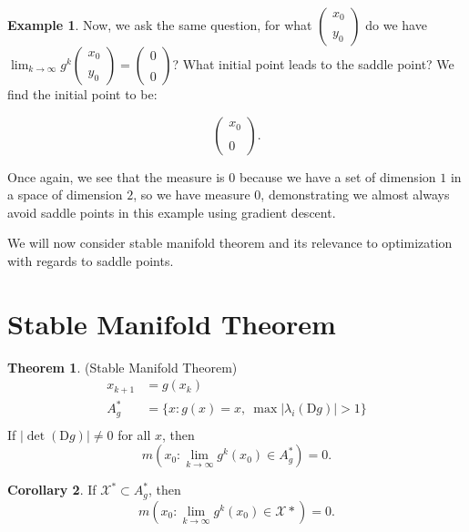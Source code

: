 \documentclass[twoside]{article}
\theoremstyle{definition}
\newtheorem{thm}{Theorem}[section]
\newtheorem{cor}[thm]{Corollary}
\theoremstyle{definition}
\newtheorem{exmp}{Example}
\theoremstyle{remark}
\begin{document}
\begin{exmp}
Now, we ask the same question, for what $\left(\begin{smallmatrix} x_{0} \\ \ \\ y_{0} \end{smallmatrix}\right)$ do we have $\lim_{k\to\infty} g^k\left(\begin{smallmatrix} x_{0} \\ \ \\ y_{0} \end{smallmatrix}\right) = \left(\begin{smallmatrix} 0 \\ \ \\ 0 \end{smallmatrix}\right)$? What initial point leads to the saddle point? We find the initial point to be:

$$\left(\begin{smallmatrix} x_0 \\ \ \\ 0 \end{smallmatrix}\right).$$
\end{exmp}

Once again, we see that the measure is 0 because we have a set of dimension $1$ in a space of dimension $2$, so we have measure 0, demonstrating we almost always avoid saddle points in this example using gradient descent.

We will now consider stable manifold theorem and its relevance to optimization with regards to saddle points.

\section{Stable Manifold Theorem}

\begin{thm}{(Stable Manifold Theorem)}
\[
\begin{aligned}
x_{k+1} &= g(x_k) \\
A_g^* &=  \{ x : g(x)=x, \ \max|\lambda_i (\text{D}g)| > 1 \} \\
\end{aligned}
\]
If $|\det(\text{D}g)| \neq 0$ for all $x$, then
$$m(x_0 : \lim_{k\to\infty} g^k(x_0) \in A_g^*) = 0.$$

\end{thm}

\begin{cor}
If $\mathcal{X}^* \subset A_g^*$, then
$$m(x_0 : \lim_{k\to\infty} g^k(x_0) \in \mathcal{X}*) = 0.$$
\end{cor}
\end{document}
